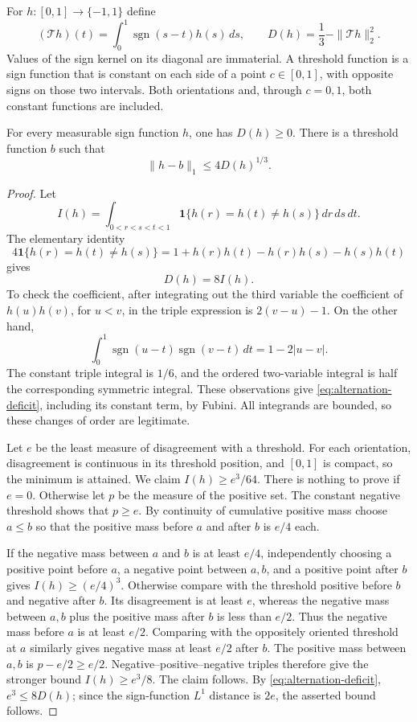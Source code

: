 For $h:[0,1]\to\{-1,1\}$ define
\[
 (\mathcal T h)(t)=\int_0^1\operatorname{sgn}(s-t)h(s)\,ds,
 \qquad D(h)=\frac13-\|\mathcal T h\|_2^2.
\]
Values of the sign kernel on its diagonal are immaterial.  A threshold
function is a sign function that is constant on each side of a point
$c\in[0,1]$, with opposite signs on those two intervals.  Both orientations
and, through $c=0,1$, both constant functions are included.

\begin{lemma}
\label{lem:one-dimensional}
For every measurable sign function $h$, one has $D(h)\ge0$.  There is a
threshold function $b$ such that
\[
 \|h-b\|_1\le4D(h)^{1/3}.
\]
\end{lemma}

\begin{proof}
Let
\[
 I(h)=\int_{0<r<s<t<1}
 \mathbf 1\{h(r)=h(t)\ne h(s)\}\,dr\,ds\,dt.
\]
The elementary identity
\[
 4\mathbf 1\{h(r)=h(t)\ne h(s)\}
 =1+h(r)h(t)-h(r)h(s)-h(s)h(t)
\]
gives
\begin{equation}
 D(h)=8I(h).
 \label{eq:alternation-deficit}
\end{equation}
To check the coefficient, after integrating out the third variable the
coefficient of $h(u)h(v)$, for $u<v$, in the triple expression is
$2(v-u)-1$.  On the other hand,
\[
 \int_0^1\operatorname{sgn}(u-t)\operatorname{sgn}(v-t)\,dt
 =1-2|u-v|.
\]
The constant triple integral is $1/6$, and the ordered two-variable
integral is half the corresponding symmetric integral.  These observations
give \eqref{eq:alternation-deficit}, including its constant term, by Fubini.
All integrands are bounded, so these changes of order are legitimate.

Let $e$ be the least measure of disagreement with a threshold.  For each
orientation, disagreement is continuous in its threshold position, and
$[0,1]$ is compact, so the minimum is attained.  We claim
$I(h)\ge e^3/64$.  There is nothing to prove if $e=0$.  Otherwise let $p$
be the measure of the positive set.  The constant negative threshold shows
that $p\ge e$.  By continuity of cumulative positive mass choose $a\le b$
so that the positive mass before $a$ and after $b$ is $e/4$ each.

If the negative mass between $a$ and $b$ is at least $e/4$, independently
choosing a positive point before $a$, a negative point between $a,b$, and
a positive point after $b$ gives $I(h)\ge(e/4)^3$.  Otherwise compare with
the threshold positive before $b$ and negative after $b$.  Its disagreement
is at least $e$, whereas the negative mass between $a,b$ plus the positive
mass after $b$ is less than $e/2$.  Thus the negative mass before $a$ is
at least $e/2$.  Comparing with the oppositely oriented threshold at $a$
similarly gives negative mass at least $e/2$ after $b$.  The positive mass
between $a,b$ is $p-e/2\ge e/2$.  Negative--positive--negative triples
therefore give the stronger bound $I(h)\ge e^3/8$.  The claim follows.
By \eqref{eq:alternation-deficit}, $e^3\le8D(h)$; since the sign-function
$L^1$ distance is $2e$, the asserted bound follows.
\end{proof}

